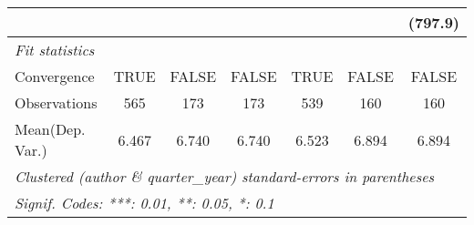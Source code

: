 \begin{tabular}{lcccccc}
                           &         &           &                &         &               & (797.9)\\   
   \midrule
   \emph{Fit statistics}\\
   Convergence             &TRUE     & FALSE     & FALSE          & TRUE    & FALSE         & FALSE\\  
   Observations            & 565     & 173       & 173            & 539     & 160           & 160\\  
Mean(Dep. Var.) & 6.467 & 6.740 & 6.740 & 6.523 & 6.894 & 6.894 \\
   \midrule \midrule
   \multicolumn{7}{l}{\emph{Clustered (author \& quarter\_year) standard-errors in parentheses}}\\
   \multicolumn{7}{l}{\emph{Signif. Codes: ***: 0.01, **: 0.05, *: 0.1}}\\
\end{tabular}
\par\endgroup

